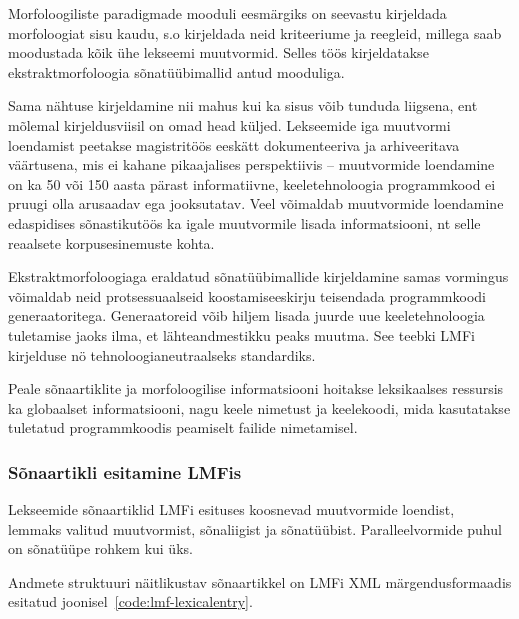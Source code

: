 \documentclass[12pt,a4paper]{article}
\begin{document}
Morfoloogiliste paradigmade mooduli eesmärgiks on seevastu kirjeldada morfoloogiat sisu kaudu, s.o kirjeldada neid kriteeriume ja reegleid, millega saab moodustada kõik ühe lekseemi muutvormid. Selles töös kirjeldatakse ekstrakt\-morfoloogia sõnatüübi\-mallid antud mooduliga.

Sama nähtuse kirjeldamine nii mahus kui ka sisus võib tunduda liigsena, ent mõlemal kirjeldusviisil on omad head küljed. Lekseemide iga muutvormi loendamist peetakse magistritöös eeskätt dokumenteeriva ja arhiveeritava väärtusena, mis ei kahane pikaajalises perspektiivis -- muutvormide loendamine on ka 50 või 150 aasta pärast informatiivne, keele\-tehnoloogia programm\-kood ei pruugi olla arusaadav ega jooksutatav. Veel võimaldab muutvormide loendamine edaspidises sõnastikutöös ka igale muutvormile lisada informatsiooni, nt selle reaalsete korpusesinemuste kohta. %

Ekstraktmorfoloogiaga eraldatud sõnatüübimallide kirjeldamine samas vormingus võimaldab neid protsessuaalseid koostamis\-eeskirju teisendada programm\-koodi generaatoritega. Generaatoreid võib hiljem lisada juurde uue keeletehnoloogia tuletamise jaoks ilma, et lähte\-andmestikku peaks muutma. See teebki LMFi kirjelduse nö tehnoloogia\-neutraalseks standardiks.

Peale sõnaartiklite ja morfoloogilise informatsiooni hoitakse leksikaalses ressursis ka globaalset informatsiooni, nagu keele nimetust ja keele\-koodi, mida kasutatakse tuletatud programmkoodis peamiselt failide nimetamisel.



\subsubsection{Sõnaartikli esitamine LMFis}
Lekseemide sõnaartiklid LMFi esituses koosnevad muutvormide loendist, lemmaks valitud muutvormist, sõnaliigist ja sõnatüübist. Paralleelvormide puhul on sõnatüüpe rohkem kui üks.

Andmete struktuuri näitlikustav sõnaartikkel on LMFi XML märgendus\-formaadis esitatud joonisel~\ref{code:lmf-lexicalentry}.
\end{document}
